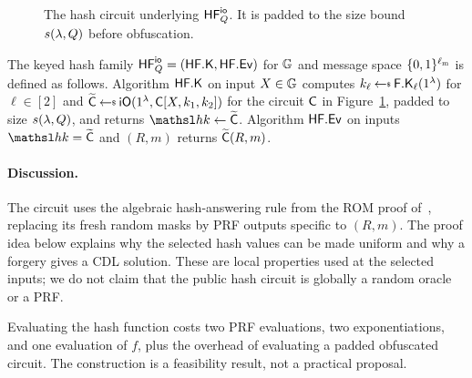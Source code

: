 \begin{figure}[t]
\begin{center}
\end{center}
\vspace{-6pt}
\caption{The hash circuit underlying $\mathsf{HF}^{\mathsf{io}}_Q$. It is padded to the size bound $s(\lambda, Q)$ before obfuscation.}\label{fig-circuit}
\vspace{-3pt}\hrulefill
\vspace{-1ex}
\end{figure}

\begin{construction} \label{constr-io}
The keyed hash family $\mathsf{HF}^{\mathsf{io}}_Q = (\mathsf{HF}.\mathsf{K}, \mathsf{HF}.\mathsf{Ev})$ for $\mathbb{G}$ and message space $\{0,1\}^{\ell_{\mathrm{m}}}$ is defined as follows. Algorithm $\mathsf{HF}.\mathsf{K}$ on input $X \in \mathbb{G}$ computes $k_\ell \getsr \PRFKg_\ell(\usecp)$ for $\ell \in [2]$ and $\widetilde{\CircC} \getsr \iO(\usecp, \CircC[X, k_1, k_2])$ for the circuit $\mathsf{C}$ in Figure~\ref{fig-circuit}, padded to size $s(\lambda, Q)$, and returns $\hk \gets \widetilde{\CircC}$. Algorithm $\mathsf{HF}.\mathsf{Ev}$ on inputs $\hk = \widetilde{\CircC}$ and $(R,m)$ returns $\widetilde{\mathsf{C}}(R, m)$.
\end{construction}

\paragraph*{Discussion.} The circuit uses the algebraic hash-answering rule from the ROM proof of~\cite{C:CFOS25}, replacing its fresh random masks by PRF outputs specific to $(R,m)$. The proof idea below explains why the selected hash values can be made uniform and why a forgery gives a CDL solution. These are local properties used at the selected inputs; we do not claim that the public hash circuit is globally a random oracle or a PRF.

Evaluating the hash function costs two PRF evaluations, two exponentiations, and one evaluation of $f$, plus the overhead of evaluating a padded obfuscated circuit. The construction is a feasibility result, not a practical proposal.

